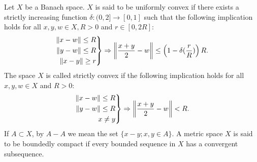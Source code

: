 \documentclass{amsart}
\newenvironment{rcases}
  {\left.\begin{aligned}}
  {\end{aligned}\right\rbrace}
\theoremstyle{definition}
\theoremstyle{remark}
\begin{document}
Let $X$ be a Banach space. $X$ is said to be uniformly convex if there exists a strictly increasing function $\delta:(0,2]\to[0,1]$ such that the following implication holds for all $x,y,w\in X, R>0$ and $r\in[0,2R]$:
\begin{eqnarray*}
\begin{rcases}
  \|x-w\|\leq R \\
 \|y-w\|\leq R \\
  \|x-y\|\geq r
\end{rcases}\Rightarrow\left\|{{x+y}\over{2}}-w\right\|\leq\left(1-\delta({r\over R})\right)R.
\end{eqnarray*}
The space $X$ is called strictly convex if the following implication holds for all $x,y,w\in X$ and $R>0$:
\begin{eqnarray*}
\begin{rcases}
  \|x-w\|\leq R \\
 \|y-w\|\leq R \\
  x\neq y
\end{rcases}\Rightarrow\left\|{{x+y}\over{2}}-w\right\|< R.
\end{eqnarray*}
If $A\subset X$, by $A-A$ we mean the set $\{x-y;x,y\in A\}$. A metric space $X$ is said to be boundedly compact if every bounded sequence in $X$ has a convergent subsequence.
\end{document}
